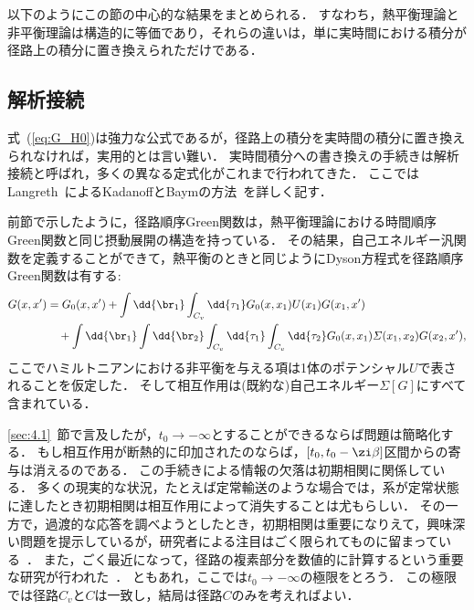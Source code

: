 \documentclass[a4paper,10pt]{jsarticle}
\begin{document}
以下のようにこの節の中心的な結果をまとめられる．
すなわち，熱平衡理論と非平衡理論は構造的に等価であり，それらの違いは，単に実時間における積分が径路上の積分に置き換えられただけである．


\subsection{\label{sec:4.3}解析接続}
式~(\ref{eq:G_H0})は強力な公式であるが，径路上の積分を実時間の積分に置き換えられなければ，実用的とは言い難い．
実時間積分への書き換えの手続きは解析接続と呼ばれ，多くの異なる定式化がこれまで行われてきた．
ここではLangreth~\cite{Langreth}によるKadanoffとBaymの方法~\cite{Kadanoff-Baym}を詳しく記す．

前節で示したように，径路順序Green関数は，熱平衡理論における時間順序Green関数と同じ摂動展開の構造を持っている．
その結果，自己エネルギー汎関数を定義することができて，熱平衡のときと同じようにDyson方程式を径路順序Green関数は有する:
\begin{align}
G (x, x')
	& = G_0 (x, x')
		+ \int \dd{\br_1} \int_{C_v} \dd{\tau_1} G_0 (x, x_1) U (x_1) G (x_1, x')
\notag \\ & \hspace{1em}
		+ \int \dd{\br_1} \int \dd{\br_2} \int_{C_v} \dd{\tau_1} \int_{C_v} \dd{\tau_2}
			G_0 (x, x_1) \varSigma (x_1, x_2) G (x_2, x')
\label{eq:Dyson}
,\end{align}
ここでハミルトニアンにおける非平衡を与える項は1体のポテンシャル$U$で表されることを仮定した．
そして相互作用は(既約な)自己エネルギー$\varSigma [G]$にすべて含まれている．

\ref{sec:4.1}~節で言及したが，$t_0 \to - \infty$とすることができるならば問題は簡略化する．
もし相互作用が断熱的に印加されたのならば，$[t_0, t_0 - \zi \beta]$区間からの寄与は消えるのである．
この手続きによる情報の欠落は初期相関に関係している．
多くの現実的な状況，たとえば定常輸送のような場合では，系が定常状態に達したとき初期相関は相互作用によって消失することは尤もらしい．
その一方で，過渡的な応答を調べようとしたとき，初期相関は重要になりえて，興味深い問題を提示しているが，研究者による注目はごく限られてものに留まっている~\cite{Yu,Wagner1991}．
また，ごく最近になって，径路の複素部分を数値的に計算するという重要な研究が行われた~\cite{Dahlen,Danielewicz1984a,Danielewicz1984b,vanLeeuwen}．
ともあれ，ここでは$t_0 \to - \infty$の極限をとろう．
この極限では径路$C_v$と$C$は一致し，結局は径路$C$のみを考えればよい．
\end{document}
